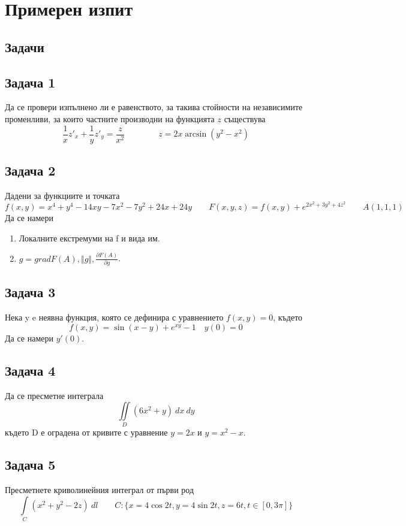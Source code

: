 \documentclass[a4paper,fleqn,12pt]{article}
\theoremstyle{definition}
\begin{document}
\newpage
\section{Примерен изпит}

\subsection{Задачи}

\subsection*{Задача 1}
Да се провери изпълнено ли е равенството, за такива стойности на независимите променливи, за които частните производни на функцията $z$ съществува
$$\frac{1}{x} z'_x + \frac{1}{y} z'_y = \frac{z}{x^2} \qquad \qquad z = 2x\arcsin(y^2- x^2)$$

\subsection*{Задача 2}
Дадени за функциите и точката
$$f(x,y) = x^4 + y^4 - 14xy - 7x^2 - 7y^2 + 24x + 24y \qquad F(x,y,z) = f(x,y) + e^{2x^2 + 3y^2 + 4z^2} \qquad A(1,1,1)$$
Да се намери
\begin{enumerate}
\item Локалните екстремуми на f и вида им. 
\item $g = grad F(A), \Vert g \Vert, \frac{\partial F(A)}{\partial g}$.
\end{enumerate}

\subsection*{Задача 3}
Нека y e неявна функция, която се дефинира с уравнението $f(x,y) = 0$, където 
$$f(x,y) = \sin(x-y) + e^{xy} - 1 \quad y(0) = 0 $$
Да се намери $y'(0)$.

\subsection*{Задача 4}
Да се пресметне интеграла
$$\iint\limits_D (6x^2 + y) \ dx \ dy$$
където D е оградена от кривите с уравнение $y=2x \text{ и } y = x^2 - x$.

\subsection*{Задача 5}
Пресметнете криволинейния интеграл от първи род
$$\int\limits_C (x^2 + y^2 - 2z) \ dl \qquad C: \{x= 4\cos 2t , y = 4\sin 2t, z = 6t, t \in [0,3\pi] \}$$
\end{document}
